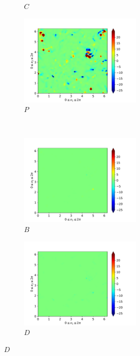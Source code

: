 \begin{figure}[H]
\begin{subfigure}{0.45\textwidth}
        \caption{$C$}
    \end{subfigure}
    \newline
    \begin{subfigure}{0.45\textwidth}
        \includegraphics[height=1.75in]{media/run-cds-65/P-ke-1400}
        \caption{$P$}
    \end{subfigure}
    ~
    \begin{subfigure}{0.45\textwidth}
        \includegraphics[height=1.75in]{media/run-cds-65/B-ke-1400}
        \caption{$B$}
    \end{subfigure}
    \newline
    \begin{subfigure}{0.45\textwidth}
        \includegraphics[height=1.75in]{media/run-cds-65/D-ke-1400}
        \caption{$D$}
    \end{subfigure}
\end{figure}
